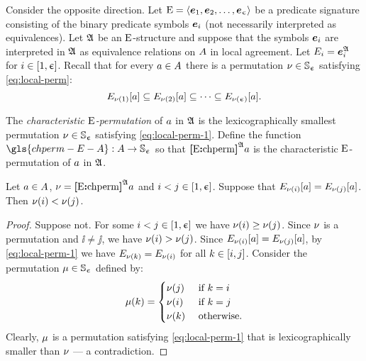 Consider the opposite direction.
Let $\mathrm{E} = \left\langle \bm{e}_{1},\bm{e}_{2},\dots,\bm{e}_{\upepsilon} \right\rangle$ be a predicate signature consisting
of the binary predicate symbols $\bm{e}_{i}$ (not necessarily interpreted as
equivalences).
Let $\mathfrak{A}$ be an $\mathrm{E}$-structure and suppose that the symbols $\bm{e}_{i}$ are
interpreted in $\mathfrak{A}$ as equivalence relations on $A$ in local agreement.
Let $E_{i} = \bm{e}_{i}^{\mathfrak{A}}$ for $i \in [1,\upepsilon]$.
Recall that for every $a \in A$ there is a permutation
$\nu \in \mathbb{S}_{\upepsilon}$ satisfying \cref{eq:local-perm}:
\begin{equation}\label{eq:local-perm-1}
  E_{\nu(1)}[a] \subseteq
  E_{\nu(2)}[a] \subseteq \dots \subseteq
  E_{\nu(\upepsilon)}[a].
\end{equation}
\begin{definition}
The \emph{characteristic $\mathrm{E}$-permutation} of $a$ in $\mathfrak{A}$ is
the lexicographically smallest permutation $\nu \in \mathbb{S}_{\upepsilon}$
satisfying \cref{eq:local-perm-1}.
Define the function $\gls{chperm-E-A} : \domA \to \Perms\nex$ so
that ${\bm{[}\mathrm{E}\mathord{\bm{:}}\mathrm{chperm}\bm{]}}^{\mathfrak{A}}a$ is the characteristic $\mathrm{E}$-permutation of $a$ in
$\mathfrak{A}$.
\end{definition}
\begin{remark}\label{rem:local-eq-perm}
Let $a \in A$, $\nu = {\bm{[}\mathrm{E}\mathord{\bm{:}}\mathrm{chperm}\bm{]}}^{\mathfrak{A}}a$ and
$i < j \in [1,\upepsilon]$.
Suppose that $E_{\nu(i)}[a] = E_{\nu(j)}[a]$.
Then $\nu(i) < \nu(j)$.
\end{remark}
\begin{proof}
Suppose not. For some $i < j \in [1,\upepsilon]$ we have
$\nu(i) \geq \nu(j)$.
Since $\nu$ is a permutation and $\ii \neq \jj$,
we have $\nu(i) > \nu(j)$.
Since $E_{\nu(i)}[a] = E_{\nu(j)}[a]$,
by \cref{eq:local-perm-1} we have $E_{\nu(k)} = E_{\nu(i)}$
for all $k \in [i, j]$.
Consider the permutation $\mu \in \mathbb{S}_{\upepsilon}$ defined by:
\[
  \mu(k) = \begin{cases}
    \nu(j) &\text{ if } k = i \\
    \nu(i) &\text{ if } k = j \\
    \nu(k) &\text{ otherwise.}
  \end{cases}
\]
Clearly, $\mu$ is a permutation satisfying \cref{eq:local-perm-1} that is
lexicographically smaller than $\nu$ --- a contradiction.
\end{proof}

